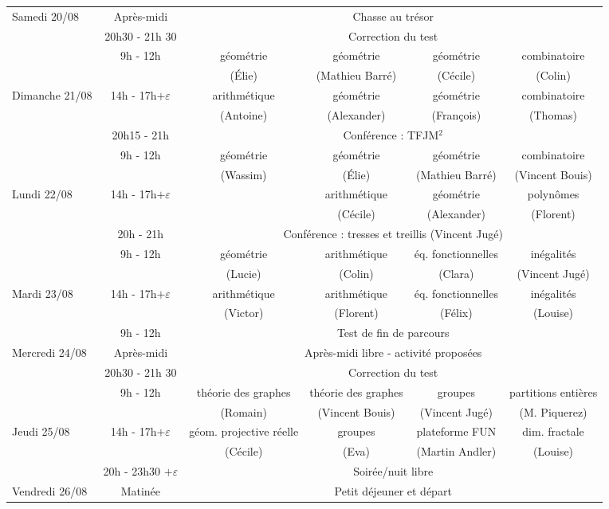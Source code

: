 \begin{center}
{\begin{tabular}{|l|c|c|c|c|c|}
\cline{2-6}
\small{Samedi 20/08} & Après-midi & \multicolumn{4}{c|}{Chasse au trésor} \\
\cline{2-6}
& 20h30 - 21h 30 & \multicolumn{4}{c|}{Correction du test} \\
\cline{2-6}
\hline
& 9h - 12h & géométrie & géométrie & géométrie & combinatoire\\
&& (Élie) & (Mathieu Barré) & (Cécile) & (Colin) \\
\cline{2-6}
\small{ Dimanche 21/08} & 14h - 17h$+ \varepsilon$ & arithmétique & géométrie & géométrie & combinatoire\\
&& (Antoine) & (Alexander)  & (François) & (Thomas) \\
\cline{2-6}
& 20h15 - 21h & \multicolumn{4}{c|}{Conférence : TFJM$^2$} \\
\hline
& 9h - 12h & géométrie & géométrie & géométrie & combinatoire \\
& &  (Wassim) &  (Élie) & (Mathieu Barré)  & (Vincent Bouis)\\
\cline{2-6}
\small{Lundi 22/08 } & 14h - 17h$+ \varepsilon$ & & arithmétique & géométrie & polynômes \\
& &  &  (Cécile) & (Alexander)  & (Florent)\\
\cline{2-6}
& 20h - 21h & \multicolumn{4}{c|}{Conférence : tresses et treillis (Vincent Jugé)} \\
\hline
& 9h - 12h & géométrie & arithmétique & éq. fonctionnelles & inégalités \\
& &  (Lucie) &  (Colin) & (Clara)  & (Vincent Jugé)\\
\cline{2-6}
\small{Mardi 23/08} & 14h - 17h$+ \varepsilon$ & arithmétique & arithmétique & éq. fonctionnelles & inégalités \\
& &  (Victor) &  (Florent) & (Félix)  & (Louise)\\
\hline
& 9h - 12h & \multicolumn{4}{c|}{Test de fin de parcours} \\
\cline{2-6}
\small{Mercredi 24/08} & Après-midi & \multicolumn{4}{c|}{Après-midi libre  - activité proposées} \\
\cline{2-6}
& 20h30 - 21h 30 & \multicolumn{4}{c|}{Correction du test} \\
\cline{2-6}
\hline
& 9h - 12h & théorie des graphes & théorie des graphes & groupes & partitions entières \\
& &  (Romain) &  (Vincent Bouis) & (Vincent Jugé)  & (M. Piquerez)\\
\cline{2-6}
\small{Jeudi 25/08} & 14h - 17h$+ \varepsilon$ & géom. projective réelle & groupes & plateforme FUN & dim. fractale \\
& &  (Cécile) &  (Eva) & (Martin Andler)  & (Louise)\\
\cline{2-6}
& 20h - 23h30 $+ \varepsilon$ & \multicolumn{4}{c|}{Soirée/nuit libre} \\\hline
Vendredi 26/08 & Matinée & \multicolumn{4}{c|}{Petit déjeuner et départ} \\
\hline
\end{tabular}}
\end{center}
